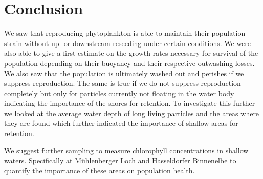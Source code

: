 \section*{Conclusion}

We saw that reproducing phytoplankton is able to maintain their population strain without up- or downstream reseeding under certain conditions.
We were also able to give a first estimate on the growth rates necessary for survival of the population depending on their buoyancy and their respective outwashing losses.
We also saw that the population is ultimately washed out and perishes if we suppress reproduction.
The same is true if we do not suppress reproduction completely but only for particles currently not floating in the water body indicating the importance of the shores for retention.
To investigate this further we looked at the average water depth of long living particles and the areas where they are found which further indicated the importance of shallow areas for retention.

We suggest further sampling to measure chlorophyll concentrations in shallow waters. Specifically at Mühlenberger Loch and Hasseldorfer Binnenelbe to quantify the importance of these areas on population health.
                


